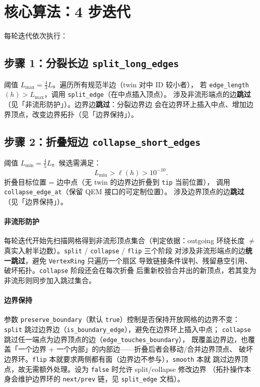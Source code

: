 \documentclass[11pt,a4paper]{article}
\begin{document}
\section{核心算法：4 步迭代}

每轮迭代依次执行：

\subsection{步骤 1：分裂长边 \texttt{split\_long\_edges}}

阈值 $L_{\max} = \frac{4}{3} L$。遍历所有规范半边（twin 对中 ID 较小者），
若 \texttt{edge\_length}$(h) > L_{\max}$，调用 \texttt{split\_edge}（在中点插入顶点）。
涉及非流形端点的边\textbf{跳过}（见「非流形防护」）。边界边\textbf{跳过}：分裂边界边
会在边界环上插入中点、增加边界顶点，改变边界拓扑（见「边界保持」）。

\subsection{步骤 2：折叠短边 \texttt{collapse\_short\_edges}}

阈值 $L_{\min} = \frac{4}{5} L$。候选需满足：
\[
  L_{\min} > \ell(h) > 10^{-10}.
\]
折叠目标位置 = 边中点（无 twin 的边界边折叠到 \texttt{tip} 当前位置），
调用 \texttt{collapse\_edge\_at}（保留 QEM 接口的可定制位置）。
涉及边界顶点的边\textbf{跳过}（见「边界保持」）。

\paragraph{非流形防护}
每轮迭代开始先扫描网格得到非流形顶点集合（判定依据：outgoing 环绕长度 $\neq$
真实入射半边数）。\texttt{split} / \texttt{collapse} / \texttt{flip} 三个阶段
对涉及非流形端点的边\textbf{统一跳过}，避免 \texttt{VertexRing} 只遍历一个扇区
导致链接条件误判、残留悬空引用、破坏拓扑。\texttt{collapse} 阶段还会在每次折叠
后重新校验合并出的新顶点，若其变为非流形则同步加入跳过集合。

\paragraph{边界保持}
参数 \texttt{preserve\_boundary}（默认 \texttt{true}）控制是否保持开放网格的边界不变：
\texttt{split} 跳过边界边（\texttt{is\_boundary\_edge}），避免在边界环上插入中点；
\texttt{collapse} 跳过任一端点为边界顶点的边（\texttt{edge\_touches\_boundary}），
既覆盖边界边，也覆盖「一个边界 + 一个内部」的内部边——折叠后者会移动/合并边界顶点、
破坏边界环。\texttt{flip} 本就要求两侧都有面（边界边不参与），\texttt{smooth} 本就
跳过边界顶点，故无需额外处理。设为 \texttt{false} 时允许 split/collapse 修改边界
（拓扑操作本身会维护边界环的 \texttt{next/prev} 链，见 \texttt{split\_edge} 文档）。
\end{document}
